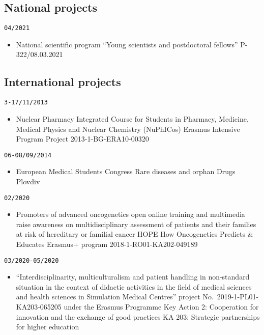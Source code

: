 \documentclass[
  12pt,
  letterpaper,
  DIV=11,
  numbers=noendperiod]{scrartcl}
\providecommand{\tightlist}{%
  \setlength{\itemsep}{0pt}\setlength{\parskip}{0pt}}\usepackage{longtable,booktabs,array}
\begin{document}
\subsection{National projects}\label{national-projects}

\texttt{04/2021}

\begin{itemize}
\tightlist
\item
  National scientific program ``Young scientists and postdoctoral
  fellows'' \textbar{} P-322/08.03.2021
\end{itemize}

\subsection{International projects}\label{international-projects}

\texttt{3-17/11/2013}

\begin{itemize}
\tightlist
\item
  Nuclear Pharmacy Integrated Course for Students in Pharmacy, Medicine,
  Medical Physics and Nuclear Chemistry (NuPhICos) \textbar{} Erasmus
  Intensive Program Project \textbar{} 2013-1-BG-ERA10-00320
\end{itemize}

\texttt{06-08/09/2014}

\begin{itemize}
\tightlist
\item
  European Medical Students Congress \textbar{} Rare diseases and orphan
  Drugs \textbar{} Plovdiv
\end{itemize}

\texttt{02/2020}

\begin{itemize}
\tightlist
\item
  Promoters of advanced oncogenetics open online training and multimedia
  raise awareness on multidisciplinary assessment of patients and their
  families at risk of hereditary or familial cancer \textbar{} HOPE How
  Oncogenetics Predicts \& Educates \textbar{} Erasmus+ program
  \textbar{} 2018-1-RO01-KA202-049189
\end{itemize}

\texttt{03/2020-05/2020}

\begin{itemize}
\tightlist
\item
  ``Interdisciplinarity, multiculturalism and patient handling in
  non-standard situation in the context of didactic activities in the
  field of medical sciences and health sciences in Simulation Medical
  Centres'' \textbar{} project No.~2019-1-PL01-KA203-065205 under the
  Erasmus Programme \textbar{} Key Action 2: Cooperation for innovation
  and the exchange of good practices \textbar{} KA 203: Strategic
  partnerships for higher education
\end{itemize}
\end{document}
